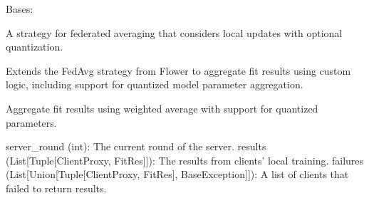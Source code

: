 \documentclass[letterpaper,10pt,english]{sphinxmanual}
\begin{document}
\begin{fulllineitems}
\label{\detokenize{insur_maskedAgg:insur_maskedAgg.LocalUpdatesStrategy}}
\pysigstartsignatures
{}
\pysigstopsignatures
\sphinxAtStartPar
Bases: 

\sphinxAtStartPar
A strategy for federated averaging that considers local updates with optional quantization.

\sphinxAtStartPar
Extends the FedAvg strategy from Flower to aggregate fit results using custom logic, 
including support for quantized model parameter aggregation.

\begin{fulllineitems}
\label{\detokenize{insur_maskedAgg:insur_maskedAgg.LocalUpdatesStrategy.aggregate_fit}}
\pysigstartsignatures
{}
\pysigstopsignatures
\sphinxAtStartPar
Aggregate fit results using weighted average with support for quantized parameters.
\begin{description}
\sphinxAtStartPar
server\_round (int): The current round of the server.
results (List{[}Tuple{[}ClientProxy, FitRes{]}{]}): The results from clients’ local training.
failures (List{[}Union{[}Tuple{[}ClientProxy, FitRes{]}, BaseException{]}{]}): A list of clients that failed to return results.


\end{description}
\end{fulllineitems}
\end{fulllineitems}
\end{document}
